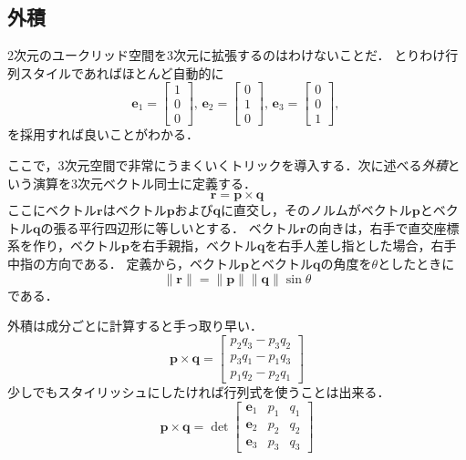\documentclass{jsbook}
\newcommand{\keyword}[1]{\emph{#1}}
\newcommand{\norm}[1]{\|{#1}\|}
\newcommand{\bvec}[1]{\boldsymbol{#1}}
\begin{document}
\subsection{外積}

2次元のユークリッド空間を3次元に拡張するのはわけないことだ．
とりわけ行列スタイルであればほとんど自動的に
\begin{equation}
\bvec{e}_1=\begin{bmatrix}1\\0\\0\end{bmatrix},\,
\bvec{e}_2=\begin{bmatrix}0\\1\\0\end{bmatrix},\,
\bvec{e}_3=\begin{bmatrix}0\\0\\1\end{bmatrix},\,
\end{equation}
を採用すれば良いことがわかる．

ここで，3次元空間で非常にうまくいくトリックを導入する．次に述べる\keyword{外積}という演算を3次元ベクトル同士に定義する．
\begin{equation}
\bvec{r}=\bvec{p}\times\bvec{q}
\end{equation}
ここにベクトル$\bvec{r}$はベクトル$\bvec{p}$および$\bvec{q}$に直交し，そのノルムがベクトル$\bvec{p}$とベクトル$\bvec{q}$の張る平行四辺形に等しいとする．
ベクトル$\bvec{r}$の向きは，右手で直交座標系を作り，ベクトル$\bvec{p}$を右手親指，ベクトル$\bvec{q}$を右手人差し指とした場合，右手中指の方向である．
%
%
定義から，ベクトル$\bvec{p}$とベクトル$\bvec{q}$の角度を$\theta$としたときに
\begin{equation}
\norm{\bvec{r}}=\norm{\bvec{p}}\norm{\bvec{q}}\sin\theta
\end{equation}
である．

外積は成分ごとに計算すると手っ取り早い．
\begin{equation}
\bvec{p}\times\bvec{q}=\begin{bmatrix}p_2q_3-p_3q_2\\p_3q_1-p_1q_3\\p_1q_2-p_2q_1\end{bmatrix}
\end{equation}
少しでもスタイリッシュにしたければ行列式を使うことは出来る．
\begin{equation}
\bvec{p}\times\bvec{q}=\det\begin{bmatrix}\bvec{e}_1&p_1&q_1\\\bvec{e}_2&p_2&q_2\\\bvec{e}_3&p_3&q_3\end{bmatrix}
\end{equation}
%
%
\end{document}
